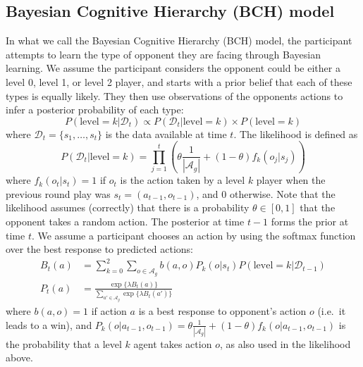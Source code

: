 \documentclass[
  english,
  man,floatsintext]{apa6}
\begin{document}
\subsection{Bayesian Cognitive Hierarchy (BCH) model}

In what we call the Bayesian Cognitive Hierarchy (BCH) model, the participant attempts to learn the type of opponent they are facing through Bayesian learning. We assume the participant considers the opponent could be either a level 0, level 1, or level 2 player, and starts with a prior belief that each of these types is equally likely. They then use observations of the opponents actions to infer a posterior probability of each type:
\[P(\text{level}=k | \mathcal{D}_{t})  \propto  P(\mathcal{D}_{t}|\text{level}=k ) \times P(\text{level}=k)\]
where \(\mathcal{D}_{t} = \{s_1,\ldots,s_t\}\) is the data available at time \(t\). The likelihood is defined as
\[P(\mathcal{D}_{t}|\text{level}=k) = \prod_{j=1}^t \left( \theta \frac{1}{|\mathcal{A}_g|} + (1-\theta) f_k(o_j|s_{j})\right)\]
where \(f_k(o_t|s_{t}) = 1\) if \(o_t\) is the action taken by a level \(k\) player when the previous round play was \(s_t = (a_{t-1}, o_{t-1})\), and 0 otherwise. Note that the likelihood assumes (correctly) that there is a probability \(\theta \in [0,1]\) that the opponent takes a random action. The posterior at time \(t-1\) forms the prior at time \(t\). We assume a participant chooses an action by using the softmax function over the best response to predicted actions:
\[\begin{aligned} B_t(a) &= \sum_{k = 0}^2 \sum_{o \in \mathcal{A}_g} b(a,o) P_k(o|s_{t})  P(\text{level}=k|\mathcal{D}_{t-1})\\
P_t(a) &= \frac{\exp\{\lambda B_t(a) \}}{\sum_{a' \in \mathcal{A}_g} \exp \{ \lambda B_t(a')\}} \end{aligned}\]
where \(b(a,o) = 1\) if action \(a\) is a best response to opponent's action \(o\) (i.e.~it leads to a win), and \(P_k(o|a_{t-1},o_{t-1}) = \theta \frac{1}{|\mathcal{A}_g|} + (1-\theta) f_k(o|a_{t-1},o_{t-1})\) is the probability that a level \(k\) agent takes action \(o\), as also used in the likelihood above.
\end{document}
